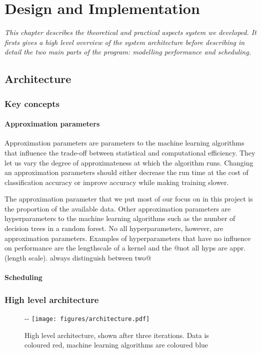 \documentclass[a4paper,12pt,twoside,openright]{report}
\begin{document}
\chapter{Design and Implementation} 



\textit{This chapter describes the theoretical and practical aspects system we developed. It firsts gives a high level overview of the system architecture before describing in detail the two main parts of the program: modelling performance and scheduling.}

\section{Architecture} %
\subsection{Key concepts}
\subsubsection{Approximation parameters}
Approximation parameters are parameters to the machine learning algorithms that influence the trade-off between statistical and computational efficiency. They let us vary the degree of approximateness at which the algorithm runs. Changing an approximation parameters should either decrease the run time at the cost of classification accuracy or improve accuracy while making training slower. 

The approximation parameter that we put most of our focus on in this project is the proportion of the available data. Other approximation parameters are hyperparameters to the machine learning algorithms such as the number of decision trees in a random forest. No all hyperparameters, however, are approximation parameters. Examples of hyperparameters that have no influence on performance are the lengthscale of a kernel and the 
@not all hyps are appr.(length scale). always distinguish between two@

\subsubsection{Scheduling}


\subsection{High level architecture}
\begin{figure}[!ht]
  \begin{adjustwidth}{-\oddsidemargin-2in}{-\rightmargin-1.5in}
    \centering
    \texttt{[image: figures/architecture.pdf]}
    
  \end{adjustwidth}
  \caption{High level architecture, shown after three iterations. Data is coloured red, machine learning algorithms are coloured blue}
    \label{architecture}
\end{figure}
\end{document}
